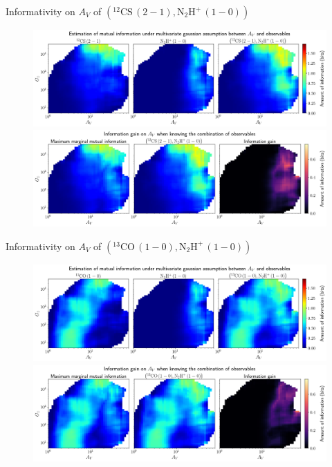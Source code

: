 \documentclass{beamer}
\begin{document}
\begin{frame}{Informativity on $A_V$ of $\left(\mathrm{^{12}CS\,(2-1)},\mathrm{N_2H^+\,(1-0)}\right)$}
    \begin{figure}
        \centering
        \includegraphics[width=0.95\linewidth]{../linearinfogauss/av__12cs21_n2hp10_linearinfogauss.png}
        \vfill
        \includegraphics[width=0.95\linewidth]{../linearinfogauss/av__12cs21_n2hp10_linearinfogauss_gain.png}
    \end{figure}
\end{frame}

\begin{frame}{Informativity on $A_V$ of $\left(\mathrm{^{13}CO\,(1-0)},\mathrm{N_2H^+\,(1-0)}\right)$}
    \begin{figure}
        \centering
        \includegraphics[width=0.95\linewidth]{../linearinfogauss/av__13co10_n2hp10_linearinfogauss.png}
        \vfill
        \includegraphics[width=0.95\linewidth]{../linearinfogauss/av__13co10_n2hp10_linearinfogauss_gain.png}
    \end{figure}
\end{frame}
\end{document}
